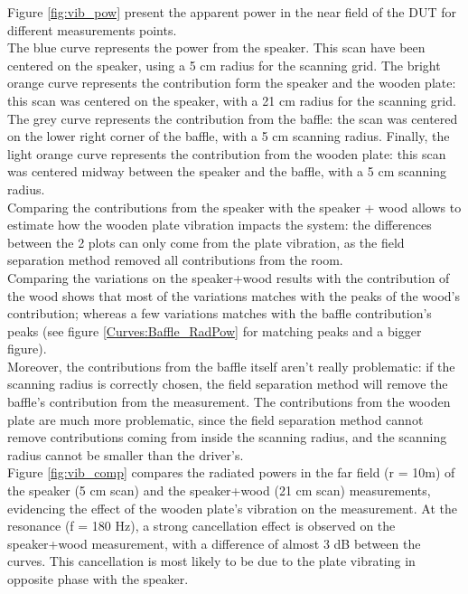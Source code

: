 \documentclass{report}
\begin{document}
Figure \ref{fig:vib_pow} present the apparent power in the near field of the DUT for different measurements points. \\
The blue curve represents the power from the speaker. This scan have been centered on the speaker, using a 5 cm radius for the scanning grid. The bright orange curve represents the contribution form the speaker and the wooden plate: this scan was centered on the speaker, with a 21 cm radius for the scanning grid. The grey curve represents the contribution from the baffle: the scan was centered on the lower right corner of the baffle, with a 5 cm scanning radius. Finally, the light orange curve represents the contribution from the wooden plate: this scan was centered midway between the speaker and the baffle, with a 5 cm scanning radius. \\

Comparing the contributions from the speaker with the speaker + wood allows to estimate how the wooden plate vibration impacts the system: the differences between the 2 plots can only come from the plate vibration, as the field separation method removed all contributions from the room. \\
Comparing the variations on the speaker+wood results with the contribution of the wood shows that most of the variations matches with the peaks of the wood's contribution; whereas a few variations matches with the baffle contribution's peaks (see figure \ref{Curves:Baffle_RadPow} for matching peaks and a bigger figure). \\

Moreover, the contributions from the baffle itself aren't really problematic: if the scanning radius is correctly chosen, the field separation method will remove the baffle's contribution from the measurement. The contributions from the wooden plate are much more problematic, since the field separation method cannot remove contributions coming from inside the scanning radius, and the scanning radius cannot be smaller than the driver's. \\

Figure \ref{fig:vib_comp} compares the radiated powers in the far field (r = 10m) of the speaker (5 cm scan) and the speaker+wood (21 cm scan) measurements, evidencing the effect of the wooden plate's vibration on the measurement. At the resonance (f = 180 Hz), a strong cancellation effect is observed on the speaker+wood measurement, with a difference of almost 3 dB between the curves. This cancellation is most likely to be due to the plate vibrating in opposite phase with the speaker. \\
\end{document}

